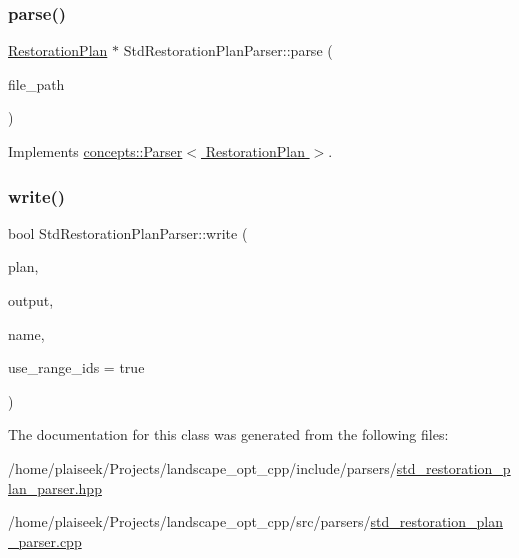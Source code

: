 \subsubsection{\texorpdfstring{parse()}{parse()}}
{\footnotesize\ttfamily \hyperlink{class_restoration_plan}{Restoration\+Plan} $\ast$ Std\+Restoration\+Plan\+Parser\+::parse (\begin{DoxyParamCaption}\item[{std\+::filesystem\+::path}]{file\+\_\+path }\end{DoxyParamCaption})\hspace{0.3cm}{\ttfamily [virtual]}}



Implements \hyperlink{classconcepts_1_1_parser_ac5e6fbf08f6d462695c946647aafb2ce}{concepts\+::\+Parser$<$ Restoration\+Plan $>$}.

\mbox{\label{class_std_restoration_plan_parser_a988b830911043a737c889971a746f13d}} 
\subsubsection{\texorpdfstring{write()}{write()}}
{\footnotesize\ttfamily bool Std\+Restoration\+Plan\+Parser\+::write (\begin{DoxyParamCaption}\item[{const \hyperlink{class_restoration_plan}{Restoration\+Plan} \&}]{plan,  }\item[{const std\+::filesystem\+::path}]{output,  }\item[{const std\+::string}]{name,  }\item[{bool}]{use\+\_\+range\+\_\+ids = {\ttfamily true} }\end{DoxyParamCaption})}



The documentation for this class was generated from the following files\+:\begin{DoxyCompactItemize}
\item 
/home/plaiseek/\+Projects/landscape\+\_\+opt\+\_\+cpp/include/parsers/\hyperlink{std__restoration__plan__parser_8hpp}{std\+\_\+restoration\+\_\+plan\+\_\+parser.\+hpp}\item 
/home/plaiseek/\+Projects/landscape\+\_\+opt\+\_\+cpp/src/parsers/\hyperlink{std__restoration__plan__parser_8cpp}{std\+\_\+restoration\+\_\+plan\+\_\+parser.\+cpp}\end{DoxyCompactItemize}
